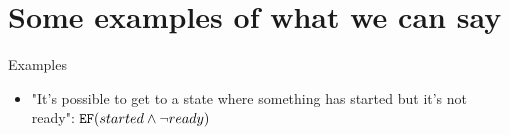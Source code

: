 \section{Some examples of what we can say}
\begin{frame}{Examples}
	\begin{itemize}
		\item 
		{
			
			"It's possible to get to a state where something has started but it's not ready": $\texttt{E}\texttt{F}(started \land \neg ready)$ 
		
			
		}
	\end{itemize}
\end{frame}